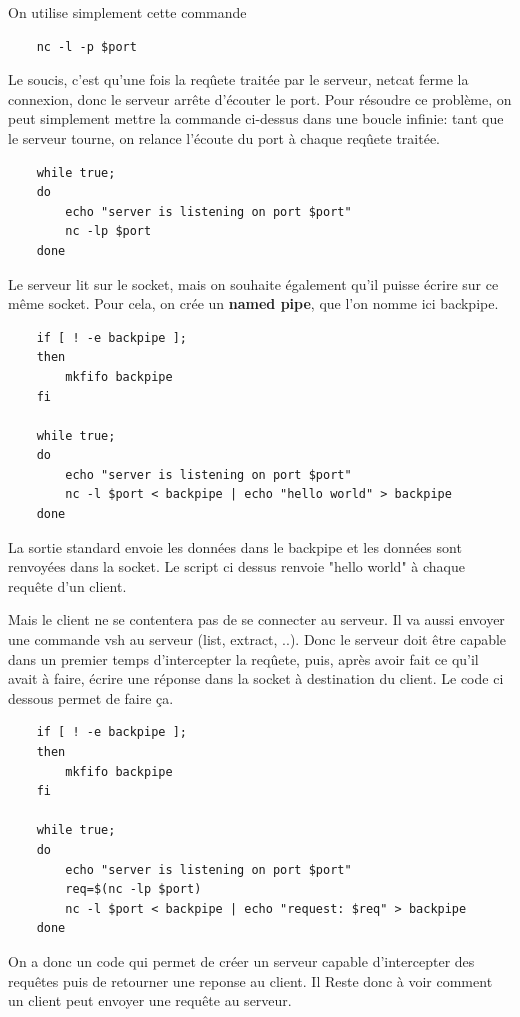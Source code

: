 \documentclass[titlepage]{article}
\begin{document}
	On utilise simplement cette commande
	\begin{lstlisting}
	nc -l -p $port
	\end{lstlisting}

	Le soucis, c'est qu'une fois la reqûete traitée par le serveur, netcat ferme la connexion, donc le serveur arrête d'écouter le port. Pour résoudre ce problème, on peut simplement mettre la commande ci-dessus dans une boucle infinie: tant que le serveur tourne, on relance l'écoute du port à chaque reqûete traitée.
	\begin{lstlisting}
	while true;
	do
		echo "server is listening on port $port"
		nc -lp $port
	done
	\end{lstlisting}

	Le serveur lit sur le socket, mais on souhaite également qu'il puisse écrire sur ce même socket. Pour cela, on crée un \textbf{named pipe}, que l'on nomme ici backpipe.
	\begin{lstlisting}
	if [ ! -e backpipe ];
	then
	    mkfifo backpipe
	fi

	while true;
	do
	    echo "server is listening on port $port"
	    nc -l $port < backpipe | echo "hello world" > backpipe
	done
	\end{lstlisting}

	La sortie standard envoie les données dans le backpipe et les données sont renvoyées dans la socket.
	Le script ci dessus renvoie "hello world" à chaque requête d'un client.

	Mais le client ne se contentera pas de se connecter au serveur. Il va aussi envoyer une commande vsh au serveur (list, extract, ..). Donc le serveur doit être capable dans un premier temps d'intercepter la reqûete, puis, après avoir fait ce qu'il avait à faire, écrire une réponse dans la socket à destination du client. Le code ci dessous permet de faire ça. 

	\begin{lstlisting}
	if [ ! -e backpipe ];
	then
	    mkfifo backpipe
	fi

	while true;
	do
	    echo "server is listening on port $port"
	    req=$(nc -lp $port)
	    nc -l $port < backpipe | echo "request: $req" > backpipe
	done
	\end{lstlisting}

	On a donc un code qui permet de créer un serveur capable d'intercepter des requêtes puis de retourner une reponse au client. Il Reste donc à voir comment un client peut envoyer une requête au serveur.

\end{document}
